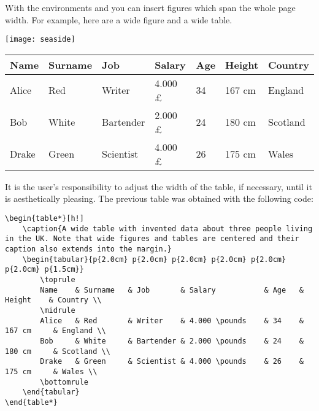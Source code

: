 With the environments  and  you 
can insert figures which span the whole page width. For example, here 
are a wide figure and a wide table.

\begin{figure*}[h!]
	\texttt{[image: seaside]}
	\caption[A wide seaside]{A wide seaside, and a wide caption.
		Credits: By Bushra Feroz, CC BY-SA 4.0, \url{https://commons.wikimedia.org/w/index.php?curid=68724647}}
\end{figure*}

\begin{table*}[h!]
    \caption{A wide table with invented data about three people living in the UK. Note that wide figures and tables are centered and their caption also extends into the margin.}
    \begin{tabular}{p{2.0cm} p{2.0cm} p{2.0cm} p{2.0cm} p{2.0cm} p{2.0cm} p{1.5cm}}
        \toprule
        Name    & Surname   & Job       & Salary           & Age   & Height    & Country \\
        \midrule
        Alice   & Red       & Writer    & 4.000 \pounds    & 34    & 167 cm     & England \\
        Bob     & White     & Bartender & 2.000 \pounds    & 24    & 180 cm     & Scotland \\
        Drake   & Green     & Scientist & 4.000 \pounds    & 26    & 175 cm     & Wales \\
        \bottomrule
    \end{tabular}
\end{table*}

It is the user's responsibility to adjust the width of the table, if 
necessary, until it is aesthetically pleasing. The previous table was 
obtained with the following code:

\begin{lstlisting}[caption=How to typeset a wide table]
\begin{table*}[h!]
    \caption{A wide table with invented data about three people living in the UK. Note that wide figures and tables are centered and their caption also extends into the margin.}
    \begin{tabular}{p{2.0cm} p{2.0cm} p{2.0cm} p{2.0cm} p{2.0cm} p{2.0cm} p{1.5cm}}
        \toprule
        Name    & Surname   & Job       & Salary           & Age   & Height    & Country \\
        \midrule
        Alice   & Red       & Writer    & 4.000 \pounds    & 34    & 167 cm     & England \\
        Bob     & White     & Bartender & 2.000 \pounds    & 24    & 180 cm     & Scotland \\
        Drake   & Green     & Scientist & 4.000 \pounds    & 26    & 175 cm     & Wales \\
        \bottomrule
    \end{tabular}
\end{table*}
\end{lstlisting}

